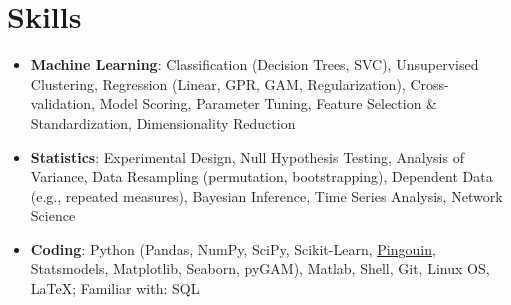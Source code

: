 \documentclass[letterpaper,10pt]{article}
\newcommand{\resumeSubHeadingListStart}{\begin{itemize}[leftmargin=*]}
\newcommand{\resumeSubHeadingListEnd}{\end{itemize}}
\begin{document}
\section{Skills}
 \resumeSubHeadingListStart
   \item{
    \textbf{Machine Learning}{: Classification (Decision Trees, SVC), Unsupervised Clustering, Regression (Linear, GPR, GAM, Regularization), Cross-validation, Model Scoring, Parameter Tuning, Feature Selection \& Standardization, Dimensionality Reduction}
    }
   \item{
    \textbf{Statistics}{: Experimental Design, Null Hypothesis Testing, Analysis of Variance, Data Resampling (permutation, bootstrapping), Dependent Data (e.g., repeated measures), Bayesian Inference, Time Series Analysis, Network Science}
    }
   \item{
    \textbf{Coding}{: Python (Pandas, NumPy, SciPy, Scikit-Learn, \href{https://pingouin-stats.org/}{\underline{Pingouin}}, Statsmodels, Matplotlib, Seaborn, pyGAM), Matlab, Shell, Git, Linux OS, LaTeX; Familiar with: SQL}
    }
 \resumeSubHeadingListEnd


\end{document}
